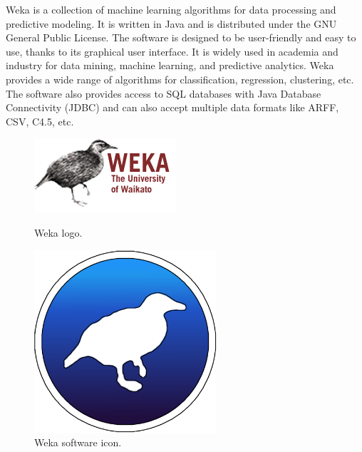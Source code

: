 Weka is a collection of machine learning algorithms for data processing and predictive modeling. It is written in Java and
is distributed under the GNU General Public License. The software is designed to be user-friendly and easy to use, thanks
to its graphical user interface. It is widely used in academia and industry for data mining, machine learning, and predictive
analytics. Weka provides a wide range of algorithms for classification, regression, clustering, etc. The software also
provides access to SQL databases with Java Database Connectivity (JDBC) and can also accept multiple data formats like
ARFF, CSV, C4.5, etc.

\begin{figure}[H]
  \centering
  \begin{minipage}[t]{0.48\textwidth}
    \centering
    \includegraphics[width=1\linewidth]{../images/Weka_logo.png}
    \caption{Weka logo.}
    \label{fig:waka-logo}
  \end{minipage}\hfill
  \begin{minipage}[t]{0.48\textwidth}
    \centering
    \includegraphics[width=0.5\linewidth]{../images/weka-icon.png}
    \caption{Weka software icon.}
    \label{fig:waka-icon}
  \end{minipage}
\end{figure}

